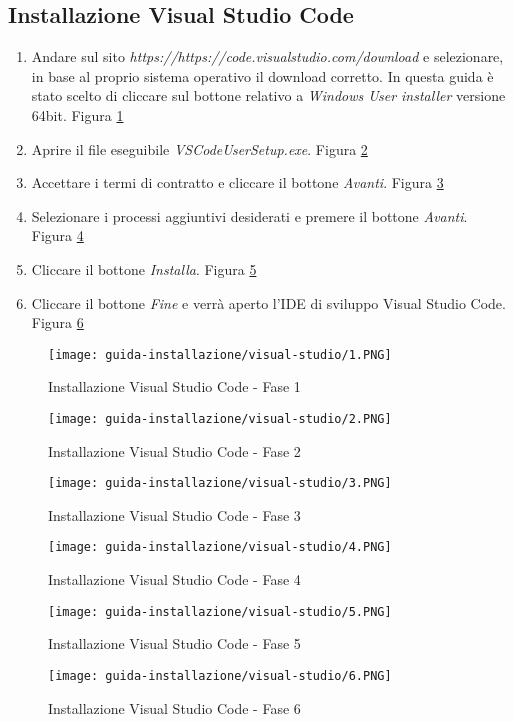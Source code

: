 \subsection{Installazione Visual Studio Code}
\begin{enumerate}
    \item Andare sul sito \textit{https://https://code.visualstudio.com/download} e selezionare, in base al proprio sistema operativo il download corretto. In questa guida 
    è stato scelto di cliccare sul bottone relativo a \textit{Windows User installer} versione 64bit. Figura \ref{fig:installazione1VS}
    \item Aprire il file eseguibile \textit{VSCodeUserSetup.exe}. Figura \ref{fig:installazione2VS}
    \item Accettare i termi di contratto e cliccare il bottone \textit{Avanti}. Figura \ref{fig:installazione3VS}
    \item Selezionare i processi aggiuntivi desiderati e premere il bottone \textit{Avanti}. Figura \ref{fig:installazione4VS}
    \item Cliccare il bottone \textit{Installa}. Figura \ref{fig:installazione5VS}
    \item Cliccare il bottone \textit{Fine} e verrà aperto l'IDE di sviluppo Visual Studio Code. Figura \ref{fig:installazione6VS}
\end{enumerate}

\clearpage

\begin{figure}[htbp]
    \texttt{[image: guida-installazione/visual-studio/1.PNG]}
    \centering
    \caption{Installazione Visual Studio Code - Fase 1}
    \label{fig:installazione1VS}
\end{figure}
\begin{figure}[htbp]
    \texttt{[image: guida-installazione/visual-studio/2.PNG]}
    \centering
    \caption{Installazione Visual Studio Code - Fase 2}
    \label{fig:installazione2VS}
\end{figure}
\begin{figure}[htbp]
    \texttt{[image: guida-installazione/visual-studio/3.PNG]}
    \centering
    \caption{Installazione Visual Studio Code - Fase 3}
    \label{fig:installazione3VS}
\end{figure}
\begin{figure}[htbp]
    \texttt{[image: guida-installazione/visual-studio/4.PNG]}
    \centering
    \caption{Installazione Visual Studio Code - Fase 4}
    \label{fig:installazione4VS}
\end{figure}
\begin{figure}[htbp]
    \texttt{[image: guida-installazione/visual-studio/5.PNG]}
    \centering
    \caption{Installazione Visual Studio Code - Fase 5}
    \label{fig:installazione5VS}
\end{figure}
\begin{figure}[htbp]
    \texttt{[image: guida-installazione/visual-studio/6.PNG]}
    \centering
    \caption{Installazione Visual Studio Code - Fase 6}
    \label{fig:installazione6VS}
\end{figure}